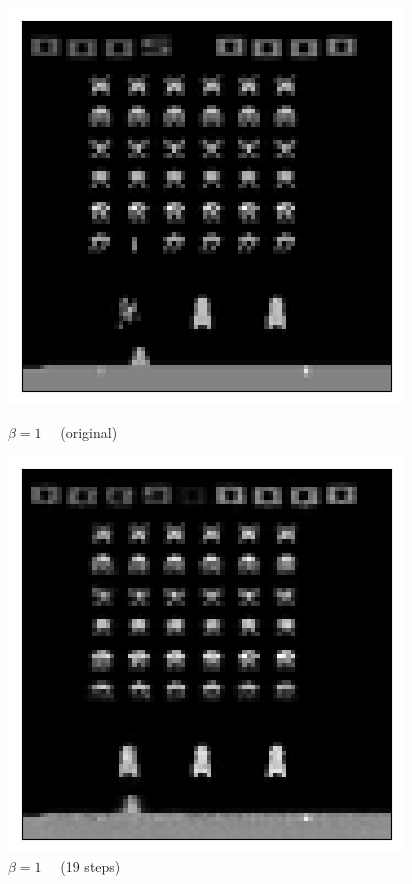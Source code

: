 \begin{figure}[h!]
\centering
\captionsetup{justification=centering}
\begin{multicols}{4}
    \includegraphics[scale=0.4]{figures/results/indiscriminate_decoupling/beta_1_posterior_sample_original.png}
    \caption{$\beta=1\quad$ (original)}
    \includegraphics[scale=0.4]{figures/results/indiscriminate_decoupling/beta_1_posterior_sample_10.png}
    \caption{$\beta=1\quad$ (19 steps)}

\end{multicols}
\end{figure}
